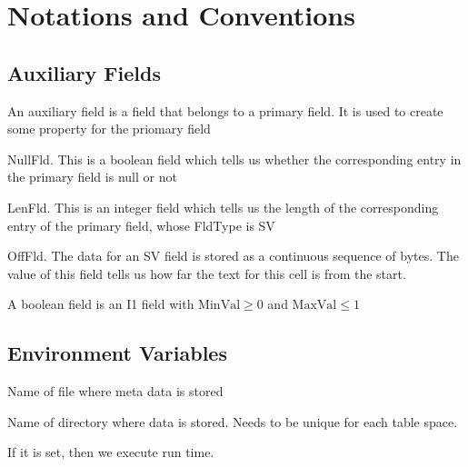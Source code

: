 \section{Notations and Conventions}

\subsection{Auxiliary Fields}
\label{aux_flds}

An auxiliary field is a field that belongs to a primary field. It is used to
create some property for the priomary field 
\be
\item NullFld. This is a boolean field which tells us whether the corresponding
entry in the primary field is null or not
\item LenFld. This is an integer field which tells us the length of the
corresponding entry of the primary field, whose FldType is SV
\item OffFld. The data for an SV field is stored as a continuous sequence of
bytes. The value of this field tells us how far the text for this cell is from
the start.
\ee


\begin{definition}
A boolean field is an I1 field with 
\(\mathrm{MinVal} \geq 0\) and 
\(\mathrm{MaxVal} \leq 1\)
\end{definition}


\subsection{Environment Variables}

\bd
\item [Q\_META\_DATA] Name of file where meta data is stored
\item [Q\_DATA\_DIR] Name of directory where data is stored. 
Needs to be unique for each table space. 
\item [Q\_RUN\_TIME\_CHECKS] If it is set, then we execute run time.
\ed


